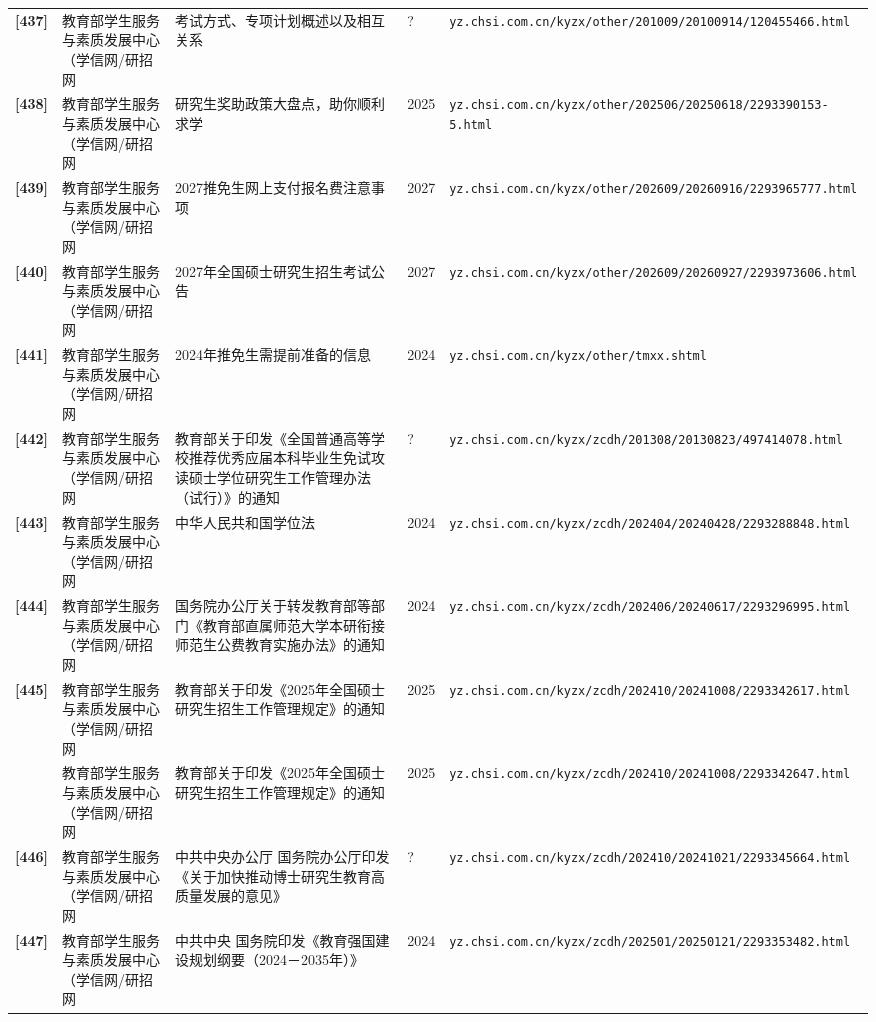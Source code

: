 {\begin{longtable}{@{}p{1.15cm}p{2.9cm}p{6.3cm}p{0.85cm}p{5.0cm}@{}}
\textbf{[437]} & 教育部学生服务与素质发展中心（学信网/研招网 & 考试方式、专项计划概述以及相互关系 & ? & \texttt{yz.chsi.com.cn/kyzx/other/201009/20100914/120455466.html} \\
\textbf{[438]} & 教育部学生服务与素质发展中心（学信网/研招网 & 研究生奖助政策大盘点，助你顺利求学 & 2025 & \texttt{yz.chsi.com.cn/kyzx/other/202506/20250618/2293390153-5.html} \\
\textbf{[439]} & 教育部学生服务与素质发展中心（学信网/研招网 & 2027推免生网上支付报名费注意事项 & 2027 & \texttt{yz.chsi.com.cn/kyzx/other/202609/20260916/2293965777.html} \\
\textbf{[440]} & 教育部学生服务与素质发展中心（学信网/研招网 & 2027年全国硕士研究生招生考试公告 & 2027 & \texttt{yz.chsi.com.cn/kyzx/other/202609/20260927/2293973606.html} \\
\textbf{[441]} & 教育部学生服务与素质发展中心（学信网/研招网 & 2024年推免生需提前准备的信息 & 2024 & \texttt{yz.chsi.com.cn/kyzx/other/tmxx.shtml} \\
\textbf{[442]} & 教育部学生服务与素质发展中心（学信网/研招网 & 教育部关于印发《全国普通高等学校推荐优秀应届本科毕业生免试攻读硕士学位研究生工作管理办法（试行）》的通知 & ? & \texttt{yz.chsi.com.cn/kyzx/zcdh/201308/20130823/497414078.html} \\
\textbf{[443]} & 教育部学生服务与素质发展中心（学信网/研招网 & 中华人民共和国学位法 & 2024 & \texttt{yz.chsi.com.cn/kyzx/zcdh/202404/20240428/2293288848.html} \\
\textbf{[444]} & 教育部学生服务与素质发展中心（学信网/研招网 & 国务院办公厅关于转发教育部等部门《教育部直属师范大学本研衔接师范生公费教育实施办法》的通知 & 2024 & \texttt{yz.chsi.com.cn/kyzx/zcdh/202406/20240617/2293296995.html} \\
\textbf{[445]} & 教育部学生服务与素质发展中心（学信网/研招网 & 教育部关于印发《2025年全国硕士研究生招生工作管理规定》的通知 & 2025 & \texttt{yz.chsi.com.cn/kyzx/zcdh/202410/20241008/2293342617.html} \\
[0] & 教育部学生服务与素质发展中心（学信网/研招网 & 教育部关于印发《2025年全国硕士研究生招生工作管理规定》的通知 & 2025 & \texttt{yz.chsi.com.cn/kyzx/zcdh/202410/20241008/2293342647.html} \\
\textbf{[446]} & 教育部学生服务与素质发展中心（学信网/研招网 & 中共中央办公厅 国务院办公厅印发《关于加快推动博士研究生教育高质量发展的意见》 & ? & \texttt{yz.chsi.com.cn/kyzx/zcdh/202410/20241021/2293345664.html} \\
\textbf{[447]} & 教育部学生服务与素质发展中心（学信网/研招网 & 中共中央 国务院印发《教育强国建设规划纲要（2024－2035年）》 & 2024 & \texttt{yz.chsi.com.cn/kyzx/zcdh/202501/20250121/2293353482.html} \\

\end{longtable}}
